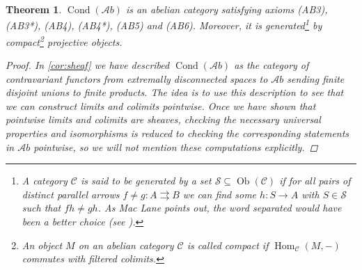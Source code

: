 \documentclass[11pt,A4]{article}
\theoremstyle{plain}
\newtheorem{thm}{Theorem}[section]
\theoremstyle{definition}
\theoremstyle{remark}
\newcommand{\1}{\mathbbm{1}}
\newcommand{\C}{\mathscr{C}}
\newcommand{\Ab}{\mathscr{A}b}
\DeclareMathOperator{\Hom}{Hom}
\DeclareMathOperator{\Cond}{Cond}
\DeclareMathOperator{\Ob}{Ob}
\begin{document}
\begin{thm}\label{thm:abelian}
    $\Cond(\Ab)$ is an abelian category satisfying axioms (AB3), (AB3*), (AB4), (AB4*), (AB5) and (AB6).
    Moreover, it is generated\footnote{A category $\C$ is said to be \textit{generated} by a set $\mathscr{S}\subseteq \Ob(\C)$ if for all pairs of distinct parallel arrows $f\neq g\colon A\rightrightarrows B$ we can find some $h\colon S\to A$ with $S\in \mathscr{S}$ such that $fh\neq gh$.
    As Mac Lane points out, the word \textit{separated} would have been a better choice (see \cite[Section V.7]{mac78}).} by compact\footnote{An object $M$ on an abelian category $\C$ is called \textit{compact} if $\Hom_{\C}(M,-)$ commutes with filtered colimits.} projective objects.
    \begin{proof}
	In \cref{cor:sheaf} we have described $\Cond(\Ab)$ as the category of contravariant functors from extremally disconnected spaces to $\Ab$ sending finite disjoint unions to finite products.
	The idea is to use this description to see that we can construct limits and colimits pointwise.
	Once we have shown that pointwise limits and colimits are sheaves, checking the necessary universal properties and isomorphisms is reduced to checking the corresponding statements in $\Ab$ pointwise, so we will not mention these computations explicitly.
	

\end{proof}
\end{thm}
\end{document}
